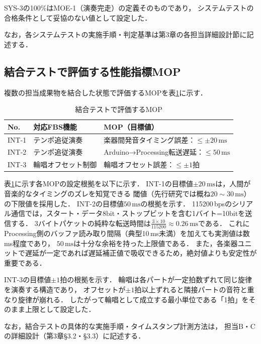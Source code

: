 \documentclass[lualatex,book,paper=a4paper,jafontsize=11.5pt,jafontscale=1.05,oneside]{jlreq}
\begin{document}
SYS-3の100\%はMOE-1（演奏完走）の定義そのものであり，
システムテストの合格条件として妥協のない値として設定した．

なお，各システムテストの実施手順・判定基準は第3章の各担当詳細設計節に記述する．

\subsection{結合テストで評価する性能指標MOP}

複数の担当成果物を結合した状態で評価するMOPを表\ref{tab:mop-int}に示す．

\begin{table}[H]
  \centering
  \caption{結合テストで評価するMOP}
  \label{tab:mop-int}
  \begin{tabularx}{\linewidth}{llX}
    \toprule
    No. & 対応FBS機能 & MOP（目標値） \\
    \midrule
    INT-1 & テンポ追従演奏 &
      楽器間発音タイミング誤差：$\leq \pm 20\,\mathrm{ms}$ \\
    INT-2 & テンポ追従演奏 &
      Arduino→Processing転送遅延：$\leq 50\,\mathrm{ms}$ \\
    INT-3 & 輪唱オフセット制御 &
      輪唱オフセット誤差：$\leq \pm 1$拍 \\
    \bottomrule
  \end{tabularx}
\end{table}

表\ref{tab:mop-int}に示す各MOPの設定根拠を以下に示す．
INT-1の目標値$\pm 20\,\mathrm{ms}$は，人間が音楽的なタイミングのズレを知覚できる
閾値（先行研究では概ね$20\sim30\,\mathrm{ms}$\cite{sudo2007,kawase}）の下限値を採用した．
INT-2の目標値$50\,\mathrm{ms}$の根拠を示す．
115200\,bpsのシリアル通信では，スタート・データ8bit・ストップビットを含む1バイト=10bitを送信する．
3バイトパケットの純粋な転送時間は$\frac{3 \times 10}{115200} \approx 0.26\,\mathrm{ms}$である．
これにProcessing側のバッファ読み取り間隔（典型10\,ms未満）を加えても実測値は数ms程度であり，
$50\,\mathrm{ms}$は十分な余裕を持った上限値である．
また，各楽器ユニットで遅延が一定であれば遅延補正値で吸収できるため，絶対値よりも安定性が重要である．

INT-3の目標値$\pm 1$拍の根拠を示す．
輪唱は各パートが一定拍数ずれて同じ旋律を演奏する構造であり，
オフセットが$\pm 1$拍以上ずれると隣接パートの音符と重なり旋律が崩れる．
したがって輪唱として成立する最小単位である「1拍」をそのまま上限として設定した．

なお，結合テストの具体的な実施手順・タイムスタンプ計測方法は，
担当B・Cの詳細設計（第3章§3.2・§3.3）に記述する．
\end{document}

